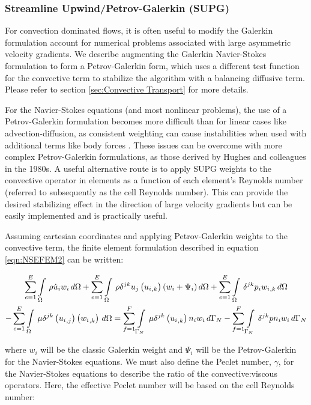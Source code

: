 \subsubsection{Streamline Upwind/Petrov-Galerkin (SUPG)}

For convection dominated flows, it is often useful to modify the Galerkin formulation account for numerical problems associated with large asymmetric  velocity gradients. We describe augmenting the Galerkin Navier-Stokes formulation to form a Petrov-Galerkin form, which uses a different test function for the convective term to stabilize the algorithm with a balancing diffusive term. Please refer to section \ref{sec:Convective Transport} for more details. 

For the Navier-Stokes equations (and most nonlinear problems), the use of a Petrov-Galerkin formulation becomes more difficult than for linear cases like advection-diffusion, as consistent weighting can cause instabilities when used with additional terms like body forces \cite{heinrich:1999}. These issues can be overcome with more complex Petrov-Galerkin formulations, as those derived by Hughes and colleagues in the 1980s. A useful alternative route is to apply SUPG weights to the convective operator in elements as a function of each element's Reynolds number (referred to subsequently as the cell Reynolds number). This can provide the desired stabilizing effect in the direction of large velocity gradients but can be easily implemented and is practically useful.    

 Assuming cartesian coordinates and applying Petrov-Galerkin weights to the convective term, the finite element formulation described in equation \ref{eqn:NSEFEM2} can be written:

\begin{multline}
 \label{NSEPGFEM1}
  \displaystyle\sum_{e=1}^{E}  \displaystyle\int\limits_{\Omega}^{} \,\rho\dot{u}_{i}w_{i}\,d\Omega 
 +\displaystyle\sum_{e=1}^{E}  \displaystyle\int\limits_{\Omega}^{} \,{\rho}{\delta}^{jk}{u_j}\left(  {u_{i}}_{,k}  \right)({w_{i}+\Psi_{i}})\,d\Omega 
 +\displaystyle\sum_{e=1}^{E}  \displaystyle\int\limits_{\Omega}^{} \,{\delta}^{jk}{p_{i}}{ {w_{i}}_{,k} }\,d\Omega \\
 -\displaystyle\sum_{e=1}^{E}  \displaystyle\int\limits_{\Omega}^{} \,{\mu}{\delta}^{jk}\left(  {u_{i}}_{,j}  \right)\left(  {w_{i}}_{,k}  \right)\,d\Omega =
 \displaystyle\sum_{f=1}^{F}  \displaystyle\int\limits_{\Gamma_N}^{} \,{\mu}{\delta}^{jk}\left(  {u_{i}}_{,k}  \right){n_{i}}{w_{i}}\,d\Gamma_N 
-\displaystyle\sum_{f=1}^{F}  \displaystyle\int\limits_{\Gamma_N}^{} \,{\delta}^{jk}{p}{n_i}{w_i}\,d\Gamma_N 
\end{multline}

where $w_i$ will be the classic Galerkin weight and $\Psi_i$ will be the Petrov-Galerkin for the Navier-Stokes equations. We must also define the Peclet number, $\gamma$, for the Navier-Stokes equations to describe the ratio of the convective:viscous operators. Here, the effective Peclet number will be based on the cell Reynolds number:

